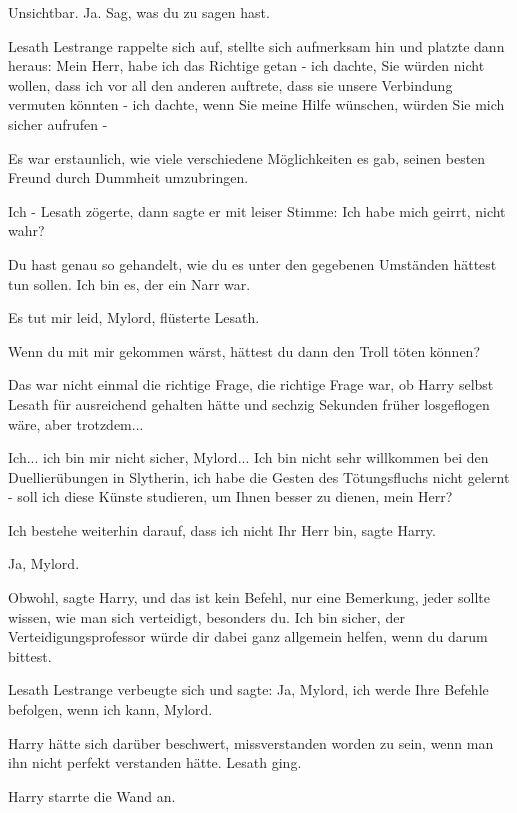 \glqq{}Unsichtbar. Ja. Sag, was du zu sagen hast.\grqq{}

Lesath Lestrange rappelte sich auf, stellte sich aufmerksam hin und platzte dann
heraus: \glqq{}Mein Herr, habe ich das Richtige getan - ich dachte, Sie würden
nicht wollen, dass ich vor all den anderen auftrete, dass sie unsere Verbindung
vermuten könnten - ich dachte, wenn Sie meine Hilfe wünschen, würden Sie mich
sicher aufrufen -\grqq{}

Es war erstaunlich, wie viele verschiedene Möglichkeiten es gab, seinen besten
Freund durch Dummheit umzubringen.

\glqq{}Ich -\grqq{} Lesath zögerte, dann sagte er mit leiser Stimme: \glqq{}Ich
habe mich geirrt, nicht wahr?\grqq{}

\glqq{}Du hast genau so gehandelt, wie du es unter den gegebenen Umständen
hättest tun sollen. Ich bin es, der ein Narr war.\grqq{}

\glqq{}Es tut mir leid, Mylord\grqq{}, flüsterte Lesath.

\glqq{}Wenn du mit mir gekommen wärst, hättest du dann den Troll töten
können?\grqq{}

Das war nicht einmal die richtige Frage, die richtige Frage war, ob Harry selbst
Lesath für ausreichend gehalten hätte und sechzig Sekunden früher losgeflogen
wäre, aber trotzdem...

\glqq{}Ich... ich bin mir nicht sicher, Mylord... Ich bin nicht sehr willkommen
bei den Duellierübungen in Slytherin, ich habe die Gesten des Tötungsfluchs
nicht gelernt - soll ich diese Künste studieren, um Ihnen besser zu dienen, mein
Herr?\grqq{}

\glqq{}Ich bestehe weiterhin darauf, dass ich nicht Ihr Herr bin\grqq{}, sagte
Harry.

\glqq{}Ja, Mylord.\grqq{}

\glqq{}Obwohl\grqq{}, sagte Harry, \glqq{}und das ist kein Befehl, nur eine
Bemerkung, jeder sollte wissen, wie man sich verteidigt, besonders du. Ich bin
sicher, der Verteidigungsprofessor würde dir dabei ganz allgemein helfen, wenn
du darum bittest.\grqq{}

Lesath Lestrange verbeugte sich und sagte: \glqq{}Ja, Mylord, ich werde Ihre
Befehle befolgen, wenn ich kann, Mylord.\grqq{}

Harry hätte sich darüber beschwert, missverstanden worden zu sein, wenn man ihn
nicht perfekt verstanden hätte. Lesath ging.

Harry starrte die Wand an.

